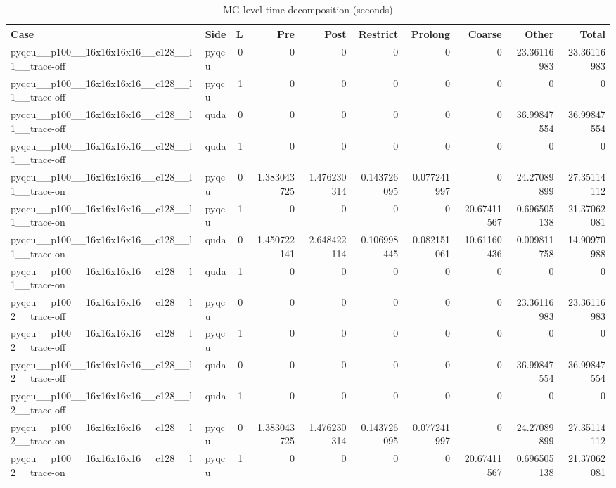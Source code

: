 
\begin{table}[htbp]
\centering
\caption{MG level time decomposition (seconds)}
\small
\begin{tabular}{@{}llrrrrrrrr@{}}
\toprule
Case & Side & L & Pre & Post & Restrict & Prolong & Coarse & Other & Total \\
\midrule
pyqcu\_\_p100\_\_16x16x16x16\_\_c128\_\_l1\_\_trace-off & pyqcu & 0 & 0 & 0 & 0 & 0 & 0 & 23.36116983 & 23.36116983 \\
pyqcu\_\_p100\_\_16x16x16x16\_\_c128\_\_l1\_\_trace-off & pyqcu & 1 & 0 & 0 & 0 & 0 & 0 & 0 & 0 \\
pyqcu\_\_p100\_\_16x16x16x16\_\_c128\_\_l1\_\_trace-off & quda & 0 & 0 & 0 & 0 & 0 & 0 & 36.99847554 & 36.99847554 \\
pyqcu\_\_p100\_\_16x16x16x16\_\_c128\_\_l1\_\_trace-off & quda & 1 & 0 & 0 & 0 & 0 & 0 & 0 & 0 \\
pyqcu\_\_p100\_\_16x16x16x16\_\_c128\_\_l1\_\_trace-on & pyqcu & 0 & 1.383043725 & 1.476230314 & 0.143726095 & 0.077241997 & 0 & 24.27089899 & 27.35114112 \\
pyqcu\_\_p100\_\_16x16x16x16\_\_c128\_\_l1\_\_trace-on & pyqcu & 1 & 0 & 0 & 0 & 0 & 20.67411567 & 0.696505138 & 21.37062081 \\
pyqcu\_\_p100\_\_16x16x16x16\_\_c128\_\_l1\_\_trace-on & quda & 0 & 1.450722141 & 2.648422114 & 0.106998445 & 0.082151061 & 10.61160436 & 0.009811758 & 14.90970988 \\
pyqcu\_\_p100\_\_16x16x16x16\_\_c128\_\_l1\_\_trace-on & quda & 1 & 0 & 0 & 0 & 0 & 0 & 0 & 0 \\
pyqcu\_\_p100\_\_16x16x16x16\_\_c128\_\_l2\_\_trace-off & pyqcu & 0 & 0 & 0 & 0 & 0 & 0 & 23.36116983 & 23.36116983 \\
pyqcu\_\_p100\_\_16x16x16x16\_\_c128\_\_l2\_\_trace-off & pyqcu & 1 & 0 & 0 & 0 & 0 & 0 & 0 & 0 \\
pyqcu\_\_p100\_\_16x16x16x16\_\_c128\_\_l2\_\_trace-off & quda & 0 & 0 & 0 & 0 & 0 & 0 & 36.99847554 & 36.99847554 \\
pyqcu\_\_p100\_\_16x16x16x16\_\_c128\_\_l2\_\_trace-off & quda & 1 & 0 & 0 & 0 & 0 & 0 & 0 & 0 \\
pyqcu\_\_p100\_\_16x16x16x16\_\_c128\_\_l2\_\_trace-on & pyqcu & 0 & 1.383043725 & 1.476230314 & 0.143726095 & 0.077241997 & 0 & 24.27089899 & 27.35114112 \\
pyqcu\_\_p100\_\_16x16x16x16\_\_c128\_\_l2\_\_trace-on & pyqcu & 1 & 0 & 0 & 0 & 0 & 20.67411567 & 0.696505138 & 21.37062081 \\

\end{tabular}
\end{table}
